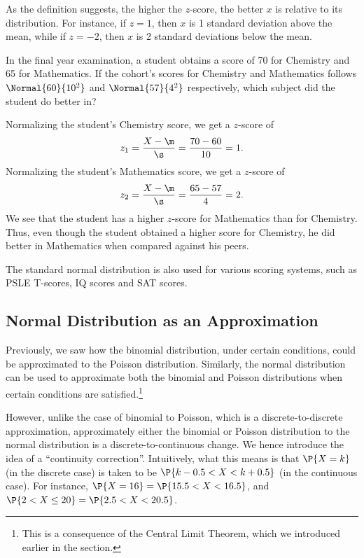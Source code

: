 As the definition suggests, the higher the $z$-score, the better $x$ is relative to its distribution. For instance, if $z = 1$, then $x$ is 1 standard deviation above the mean, while if $z = -2$, then $x$ is 2 standard deviations below the mean.

\begin{sample}
    In the final year examination, a student obtains a score of 70 for Chemistry and 65 for Mathematics. If the cohort's scores for Chemistry and Mathematics follows $\Normal{60}{10^2}$ and $\Normal{57}{4^2}$ respectively, which subject did the student do better in?
\end{sample}
\begin{sampans}
    Normalizing the student's Chemistry score, we get a $z$-score of \[z_1 = \frac{X - \m}{\s} = \frac{70 - 60}{10} = 1.\] Normalizing the student's Mathematics score, we get a $z$-score of \[z_2 = \frac{X - \m}{\s} = \frac{65 - 57}{4} = 2.\] We see that the student has a higher $z$-score for Mathematics than for Chemistry. Thus, even though the student obtained a higher score for Chemistry, he did better in Mathematics when compared against his peers.
\end{sampans}

The standard normal distribution is also used for various scoring systems, such as PSLE T-scores, IQ scores and SAT scores.

\subsection{Normal Distribution as an Approximation}

Previously, we saw how the binomial distribution, under certain conditions, could be approximated to the Poisson distribution. Similarly, the normal distribution can be used to approximate both the binomial and Poisson distributions when certain conditions are satisfied.\footnote{This is a consequence of the Central Limit Theorem, which we introduced earlier in the section.}

However, unlike the case of binomial to Poisson, which is a discrete-to-discrete approximation, approximately either the binomial or Poisson distribution to the normal distribution is a discrete-to-continuous change. We hence introduce the idea of a ``continuity correction''. Intuitively, what this means is that $\P{X = k}$ (in the discrete case) is taken to be $\P{k-0.5 < X < k + 0.5}$ (in the continuous case). For instance, $\P{X = 16} = \P{15.5 < X < 16.5}$, and $\P{2 < X \leq 20} = \P{2.5 < X < 20.5}$.

